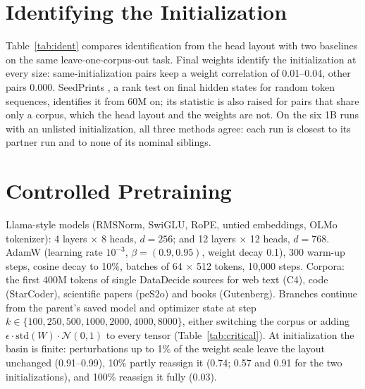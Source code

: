 \documentclass[11pt]{article}
\begin{document}
\section{Identifying the Initialization}
\label{app:ident}

Table~\ref{tab:ident} compares identification from the head layout with two baselines on the same leave-one-corpus-out task.
Final weights identify the initialization at every size: same-initialization pairs keep a weight correlation of 0.01--0.04, other pairs 0.000.
SeedPrints \citep{tong2026seedprints}, a rank test on final hidden states for random token sequences, identifies it from 60M on; its statistic is also raised for pairs that share only a corpus, which the head layout and the weights are not.
On the six 1B runs with an unlisted initialization, all three methods agree: each run is closest to its partner run and to none of its nominal siblings.

\section{Controlled Pretraining}
\label{app:controlled}
Llama-style models (RMSNorm, SwiGLU, RoPE, untied embeddings, OLMo tokenizer): 4 layers $\times$ 8 heads, $d = 256$; and 12 layers $\times$ 12 heads, $d = 768$.
AdamW (learning rate $10^{-3}$, $\beta = (0.9, 0.95)$, weight decay 0.1), 300 warm-up steps, cosine decay to 10\%, batches of 64 $\times$ 512 tokens, 10{,}000 steps.
Corpora: the first 400M tokens of single DataDecide sources for web text (C4), code (StarCoder), scientific papers (peS2o) and books (Gutenberg).
Branches continue from the parent's saved model and optimizer state at step $k \in \{100, 250, 500, 1000, 2000, 4000, 8000\}$, either switching the corpus or adding $\epsilon \cdot \mathrm{std}(W) \cdot \mathcal{N}(0, 1)$ to every tensor (Table~\ref{tab:critical}).
At initialization the basin is finite: perturbations up to 1\% of the weight scale leave the layout unchanged (0.91--0.99), 10\% partly reassign it (0.74; 0.57 and 0.91 for the two initializations), and 100\% reassign it fully (0.03).
\end{document}
